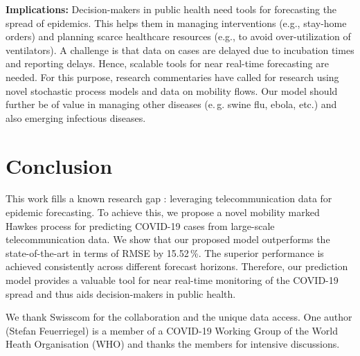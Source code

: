 \documentclass[sigconf, review = false, nonacm = true]{acmart}
\newcommand\eg{e.\,g.\xspace}
\begin{document}
\textbf{Implications:} Decision-makers in public health need tools for forecasting the spread of epidemics. This helps them in managing interventions (e.g., stay-home orders) and planning scarce healthcare resources (e.g., to avoid over-utilization of ventilators). A challenge is that data on cases are delayed due to incubation times and reporting delays. Hence, scalable tools for near real-time forecasting are needed. For this purpose, research commentaries \cite{bertozzi_challenges_2020,grantz_use_2020, oliver_mobile_2020} have called for research using novel stochastic process models and data on mobility flows. Our model should further be of value in managing other diseases (\eg swine flu, ebola, etc.) and also emerging infectious diseases.


\section{Conclusion}

This work fills a known research gap \cite{grantz_use_2020, oliver_mobile_2020}: leveraging telecommunication data for epidemic forecasting. To achieve this, we propose a novel mobility marked Hawkes process for predicting COVID-19 cases from large-scale telecommunication data. We show that our proposed model outperforms the state-of-the-art in terms of RMSE by 15.52\,\%. The superior performance is achieved consistently across different forecast horizons. Therefore, our prediction model provides a valuable tool for near real-time monitoring of the COVID-19 spread and thus aids decision-makers in public health. 


\begin{acks}
We thank Swisscom for the collaboration and the unique data access. One author (Stefan Feuerriegel) is a member of a COVID-19 Working Group of the World Heath Organisation (WHO) and thanks the members for intensive discussions.
\end{acks}



\end{document}
